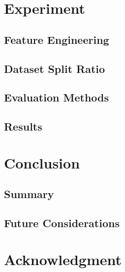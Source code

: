 \documentclass{ieeeojies}
\begin{document}
\section{Experiment}
\subsection{Feature Engineering}
\subsection {Dataset Split Ratio}
\subsection {Evaluation Methods}
\subsection {Results}

\section{Conclusion}

\subsection{Summary}

\subsection{Future Considerations}

\section*{Acknowledgment}
\end{document}
